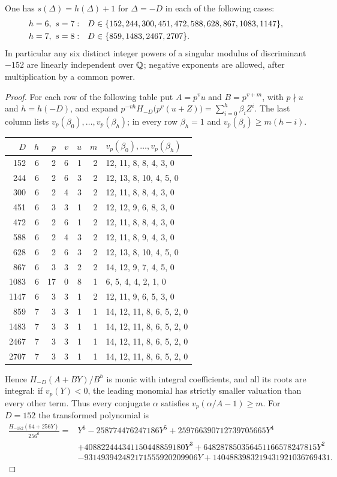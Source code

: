 \begin{theorem}\label{smd:thm:seven}
One has $s(\Delta)=h(\Delta)+1$ for $\Delta=-D$ in each of the following cases:
\[
\begin{aligned}
 h&=6,\ s=7: && D\in\{152,244,300,451,472,588,628,867,1083,1147\},\\
 h&=7,\ s=8: && D\in\{859,1483,2467,2707\}.
\end{aligned}
\]
In particular any six distinct integer powers of a singular modulus of discriminant $-152$
are linearly independent over $\mathbb{Q}$; negative exponents are allowed, after multiplication by a
common power.
\end{theorem}

\begin{proof}
For each row of the following table put $A=p^vu$ and $B=p^{v+m}$, with $p\nmid u$ and
$h=h(-D)$, and expand $p^{-vh}H_{-D}\bigl(p^v(u+Z)\bigr)=\sum_{i=0}^h\beta_iZ^i$. The last
column lists $v_p(\beta_0),\dots,v_p(\beta_h)$; in every row $\beta_h=1$ and
$v_p(\beta_i)\ge m(h-i)$.
\begin{center}
\small
\begin{tabular}{rrrrrrl}
\toprule
$D$ & $h$ & $p$ & $v$ & $u$ & $m$ & $v_p(\beta_0),\dots,v_p(\beta_h)$\\
\midrule
152  &6&2&6&1&2&12, 11, 8, 8, 4, 3, 0\\
244  &6&2&6&3&2&12, 13, 8, 10, 4, 5, 0\\
300  &6&2&4&3&2&12, 11, 8, 8, 4, 3, 0\\
451  &6&3&3&1&2&12, 12, 9, 6, 8, 3, 0\\
472  &6&2&6&1&2&12, 11, 8, 8, 4, 3, 0\\
588  &6&2&4&3&2&12, 11, 8, 9, 4, 3, 0\\
628  &6&2&6&3&2&12, 13, 8, 10, 4, 5, 0\\
867  &6&3&3&2&2&14, 12, 9, 7, 4, 5, 0\\
1083 &6&17&0&8&1&6, 5, 4, 4, 2, 1, 0\\
1147 &6&3&3&1&2&12, 11, 9, 6, 5, 3, 0\\
859  &7&3&3&1&1&14, 12, 11, 8, 6, 5, 2, 0\\
1483 &7&3&3&1&1&14, 12, 11, 8, 6, 5, 2, 0\\
2467 &7&3&3&1&1&14, 12, 11, 8, 6, 5, 2, 0\\
2707 &7&3&3&1&1&14, 12, 11, 8, 6, 5, 2, 0\\
\bottomrule
\end{tabular}
\end{center}
Hence $H_{-D}(A+BY)/B^h$ is monic with integral coefficients, and all its roots are
integral: if $v_p(Y)<0$, the leading monomial has strictly smaller valuation than every
other term. Thus every conjugate $\alpha$ satisfies $v_p(\alpha/A-1)\ge m$. For $D=152$ the
transformed polynomial is
\[
\begin{aligned}
 \frac{H_{-152}(64+256Y)}{256^6}={}&Y^6-258774476247186Y^5+259766390712739705665Y^4\\
 &+408822444341150448859180Y^3+648287850356451166578247815Y^2\\
 &-931493942482171555920209906Y+1404883983219431921036769431 .
\end{aligned}
\]


\end{proof}
